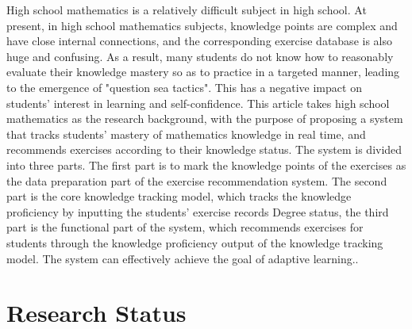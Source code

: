
High school mathematics is a relatively difficult subject in high school. At present, in high school mathematics subjects, knowledge points are complex and have close internal connections, and the corresponding exercise database is also huge and confusing. As a result, many students do not know how to reasonably evaluate their knowledge mastery so as to practice in a targeted manner, leading to the emergence of "question sea tactics". This has a negative impact on students' interest in learning and self-confidence. This article takes high school mathematics as the research background, with the purpose of proposing a system that tracks students' mastery of mathematics knowledge in real time, and recommends exercises according to their knowledge status. The system is divided into three parts. The first part is to mark the knowledge points of the exercises as the data preparation part of the exercise recommendation system. The second part is the core knowledge tracking model, which tracks the knowledge proficiency by inputting the students' exercise records Degree status, the third part is the functional part of the system, which recommends exercises for students through the knowledge proficiency output of the knowledge tracking model. The system can effectively achieve the goal of adaptive learning..

\section{Research Status}

